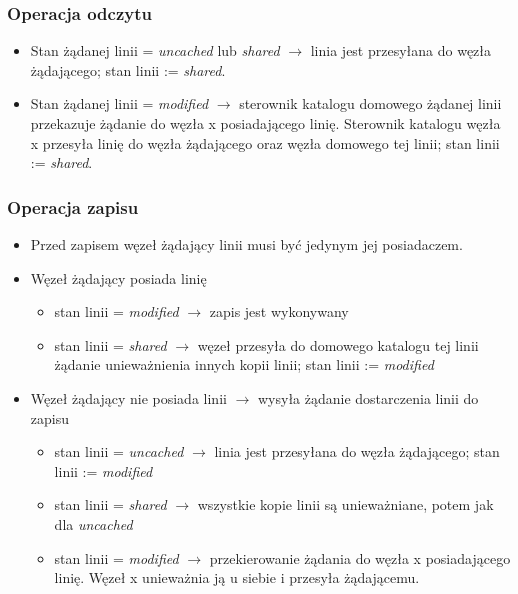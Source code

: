		\subsubsection{Operacja odczytu}
			\begin{itemize}
				\item Stan żądanej linii = \textit{uncached} lub \textit{shared} $ \rightarrow $ linia jest przesyłana do węzła żądającego; stan linii := \textit{shared}.
				\item Stan żądanej linii = \textit{modified} $ \rightarrow $ sterownik katalogu domowego żądanej linii przekazuje żądanie do węzła x posiadającego linię. Sterownik katalogu węzła x przesyła linię do węzła żądającego oraz węzła domowego tej linii; stan linii := \textit{shared}.
			\end{itemize}
		\subsubsection{Operacja zapisu}
			\begin{itemize}
				\item Przed zapisem węzeł żądający linii musi być jedynym jej posiadaczem.
				\item Węzeł żądający posiada linię
				\begin{itemize}
					\item stan linii = \textit{modified} $ \rightarrow $ zapis jest wykonywany
					\item stan linii = \textit{shared} $ \rightarrow $ węzeł przesyła do domowego katalogu tej linii żądanie unieważnienia innych kopii linii; stan linii := \textit{modified}
				\end{itemize}
				\item Węzeł żądający nie posiada linii $ \rightarrow $ wysyła żądanie dostarczenia linii do zapisu
				\begin{itemize}
					\item stan linii = \textit{uncached} $ \rightarrow $ linia jest przesyłana do węzła żądającego; stan linii := \textit{modified}
					\item stan linii = \textit{shared} $ \rightarrow $ wszystkie kopie linii są unieważniane, potem jak dla \textit{uncached}
					\item stan linii = \textit{modified} $ \rightarrow $ przekierowanie żądania do węzła x posiadającego linię. Węzeł x unieważnia ją u siebie i przesyła żądającemu.
				\end{itemize}
			\end{itemize}

